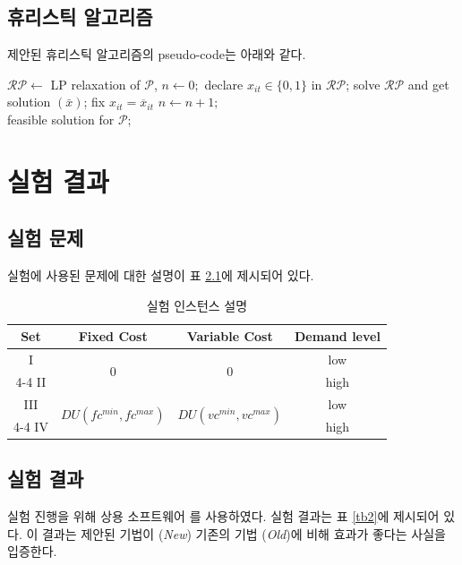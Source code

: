 \documentclass[oneside, ko,ms]{snuthesis_utf8_kor}
\begin{document}
\section{휴리스틱 알고리즘}\label{s3.2}
제안된 휴리스틱 알고리즘의 pseudo-code는 아래와 같다.
\begin{algorithm}[h]
\begin{algorithmic}

\State $\mathcal{RP} \leftarrow$ LP relaxation of $\mathcal{P}$, 
\State $n \leftarrow 0;$
  \State declare $x_{it} \in \{0,1\}$ in $\mathcal{RP}$;
 \EndFor
 \State solve $\mathcal{RP}$ and get solution $(\bar{x})$;
  \State fix $x_{it} = \overline{x}_{it}$
  \EndIf
 \EndFor
 \State $n\leftarrow n+1;$
\EndWhile \\
\Return feasible solution for $\mathcal{P}$;
\caption{Heuristic Algorithm ($\mathcal{P},r,l$)}
\end{algorithmic}
\end{algorithm}\label{heuristic algorithm}

\chapter{실험 결과}\label{c4}
\section{실험 문제}
실험에 사용된 문제에 대한 설명이 표 \ref{tb1}에 제시되어 있다.

\begin{table}[h]
\centering
\caption{실험 인스턴스 설명}
\begin{tabular}{c||c|c|c}
\toprule
Set& Fixed Cost& Variable Cost & Demand level\\
\hline
I &	\multirow{2}{*}{0}	&\multirow{2}{*}{0}	&low\\
\cline{4-4}
 II& & &high\\
\hline
III &	\multirow{2}{*}{$DU(fc^{min},fc^{max})$}&	\multirow{2}{*}{$DU(vc^{min},vc^{max})$} &low\\
\cline{4-4}
IV &&&high\\
\bottomrule
\end{tabular}
\label{tb1}
\end{table}


\newpage
\section{실험 결과}
실험 진행을 위해 상용 소프트웨어 \cite{xpress}를 사용하였다. 실험 결과는 표 \ref{tb2}에 제시되어 있다. 이 결과는 제안된 기법이 (\textit{New}) 기존의 기법 (\textit{Old})에 비해 효과가 좋다는 사실을 입증한다. 
\end{document}
